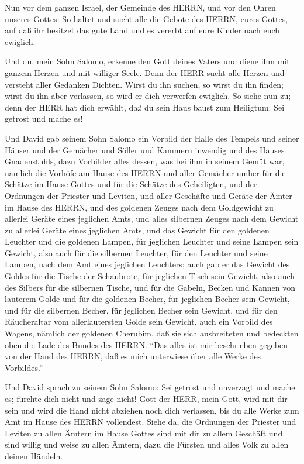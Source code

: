  Nun vor dem ganzen Israel, der Gemeinde des HERRN, und vor
den Ohren unseres Gottes: So haltet und sucht alle die Gebote des HERRN,
eures Gottes, auf daß ihr besitzet das gute Land und es vererbt auf eure
Kinder nach euch ewiglich.

 Und du, mein Sohn Salomo, erkenne den Gott deines Vaters
und diene ihm mit ganzem Herzen und mit williger Seele. Denn der HERR
sucht alle Herzen und versteht aller Gedanken Dichten. Wirst du ihn
suchen, so wirst du ihn finden; wirst du ihn aber verlassen, so wird er
dich verwerfen ewiglich.  So siehe nun zu; denn der HERR
hat dich erwählt, daß du sein Haus baust zum Heiligtum. Sei getrost und
mache es!

 Und David gab seinem Sohn Salomo ein Vorbild der Halle des
Tempels und seiner Häuser und der Gemächer und Söller und Kammern
inwendig und des Hauses Gnadenstuhls,  dazu Vorbilder alles
dessen, was bei ihm in seinem Gemüt war, nämlich die Vorhöfe am Hause
des HERRN und aller Gemächer umher für die Schätze im Hause Gottes und
für die Schätze des Geheiligten,  und der Ordnungen der
Priester und Leviten, und aller Geschäfte und Geräte der Ämter im Hause
des HERRN,  und des goldenen Zeuges nach dem Goldgewicht zu
allerlei Geräte eines jeglichen Amts, und alles silbernen Zeuges nach
dem Gewicht zu allerlei Geräte eines jeglichen Amts,  und
das Gewicht für den goldenen Leuchter und die goldenen Lampen, für
jeglichen Leuchter und seine Lampen sein Gewicht, also auch für die
silbernen Leuchter, für den Leuchter und seine Lampen, nach dem Amt
eines jeglichen Leuchters;  auch gab er das Gewicht des
Goldes für die Tische der Schaubrote, für jeglichen Tisch sein Gewicht,
also auch des Silbers für die silbernen Tische,  und für
die Gabeln, Becken und Kannen von lauterem Golde und für die goldenen
Becher, für jeglichen Becher sein Gewicht, und für die silbernen Becher,
für jeglichen Becher sein Gewicht,  und für den
Räucheraltar vom allerlautersten Golde sein Gewicht, auch ein Vorbild
des Wagens, nämlich der goldenen Cherubim, daß sie sich ausbreiteten und
bedeckten oben die Lade des Bundes des HERRN.  ``Das alles
ist mir beschrieben gegeben von der Hand des HERRN, daß es mich
unterwiese über alle Werke des Vorbildes.''

 Und David sprach zu seinem Sohn Salomo: Sei getrost und
unverzagt und mache es; fürchte dich nicht und zage nicht! Gott der
HERR, mein Gott, wird mit dir sein und wird die Hand nicht abziehen noch
dich verlassen, bis du alle Werke zum Amt im Hause des HERRN vollendest.
 Siehe da, die Ordnungen der Priester und Leviten zu allen
Ämtern im Hause Gottes sind mit dir zu allem Geschäft und sind willig
und weise zu allen Ämtern, dazu die Fürsten und alles Volk zu allen
deinen Händeln.

